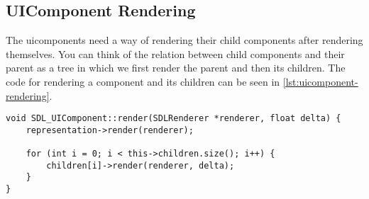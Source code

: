 \subsection{UIComponent Rendering}
\label{sec:rendering-ui}

The uicomponents need a way of rendering their child components after 
rendering themselves. You can think of the relation between child components 
and their parent as a tree in which we first render the parent and then its 
children. The code for rendering a component and its children can be 
seen in \cref{lst:uicomponent-rendering}.
\\
\begin{lstlisting}[caption={UIComponent rendering.},
label={lst:uicomponent-rendering}]
void SDL_UIComponent::render(SDLRenderer *renderer, float delta) {
    representation->render(renderer);

    for (int i = 0; i < this->children.size(); i++) {
        children[i]->render(renderer, delta);
    }
}
\end{lstlisting}
